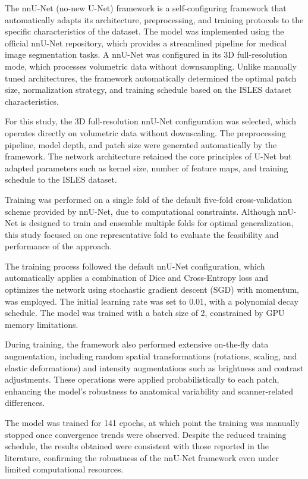 \documentclass[12pt]{article}
\begin{document}
The nnU-Net \cite{Isensee2021} (no-new U-Net) framework is a self-configuring framework that automatically adapts its architecture, preprocessing, and training protocols to the specific characteristics of the dataset. The model was implemented using the official nnU-Net repository, which provides a streamlined pipeline for medical image segmentation tasks. A nnU-Net   was configured in its 3D full-resolution mode, which processes volumetric data without downsampling. Unlike manually tuned architectures, the framework automatically determined the optimal patch size, normalization strategy, and training schedule based on the ISLES dataset characteristics.  

For this study, the 3D full-resolution nnU-Net configuration was selected, which operates directly on volumetric data without downscaling. The preprocessing pipeline, model depth, and patch size were generated automatically by the framework. The network architecture retained the core principles of U-Net but adapted parameters such as kernel size, number of feature maps, and training schedule to the ISLES dataset.

Training was performed on a single fold of the default five-fold cross-validation scheme provided by nnU-Net, due to computational constraints. Although nnU-Net is designed to train and ensemble multiple folds for optimal generalization, this study focused on one representative fold to evaluate the feasibility and performance of the approach.

The training process followed the default nnU-Net configuration, which automatically applies a combination of Dice and Cross-Entropy loss and optimizes the network using stochastic gradient descent (SGD) with momentum, was employed. The initial learning rate was set to 0.01, with a polynomial decay schedule. The model was trained with a batch size of 2, constrained by GPU memory limitations.

During training, the framework also performed extensive on-the-fly data augmentation, including random spatial transformations (rotations, scaling, and elastic deformations) and intensity augmentations such as brightness and contrast adjustments. These operations were applied probabilistically to each patch, enhancing the model’s robustness to anatomical variability and scanner-related differences.

The model was trained for 141 epochs, at which point the training was manually stopped once convergence trends were observed. Despite the reduced training schedule, the results obtained were consistent with those reported in the literature, confirming the robustness of the nnU-Net framework even under limited computational resources.
\end{document}
